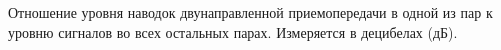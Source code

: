 Отношение уровня наводок двунаправленной приемопередачи 
в одной из пар к уровню сигналов во всех остальных парах.
Измеряется в децибелах (дБ).